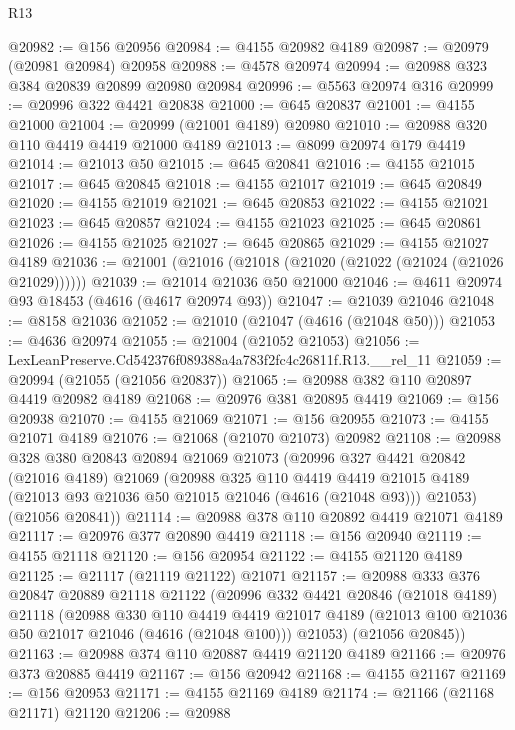 \begin{lexlean}{R13}
\begin{coremodule}
@20982 := @156 @20956
@20984 := @4155 @20982 @4189
@20987 := @20979 (@20981 @20984) @20958
@20988 := @4578 @20974
@20994 := @20988 @323 @384 @20839 @20899 @20980 @20984
@20996 := @5563 @20974 @316
@20999 := @20996 @322 @4421 @20838
@21000 := @645 @20837
@21001 := @4155 @21000
@21004 := @20999 (@21001 @4189) @20980
@21010 := @20988 @320 @110 @4419 @4419 @21000 @4189
@21013 := @8099 @20974 @179 @4419
@21014 := @21013 @50
@21015 := @645 @20841
@21016 := @4155 @21015
@21017 := @645 @20845
@21018 := @4155 @21017
@21019 := @645 @20849
@21020 := @4155 @21019
@21021 := @645 @20853
@21022 := @4155 @21021
@21023 := @645 @20857
@21024 := @4155 @21023
@21025 := @645 @20861
@21026 := @4155 @21025
@21027 := @645 @20865
@21029 := @4155 @21027 @4189
@21036 := @21001 (@21016 (@21018 (@21020 (@21022 (@21024 (@21026 @21029))))))
@21039 := @21014 @21036 @50 @21000
@21046 := @4611 @20974 @93 @18453 (@4616 (@4617 @20974 @93))
@21047 := @21039 @21046
@21048 := @8158 @21036
@21052 := @21010 (@21047 (@4616 (@21048 @50)))
@21053 := @4636 @20974
@21055 := @21004 (@21052 @21053)
@21056 := LexLeanPreserve.Cd542376f089388a4a783f2fc4c26811f.R13.__rel_11
@21059 := @20994 (@21055 (@21056 @20837))
@21065 := @20988 @382 @110 @20897 @4419 @20982 @4189
@21068 := @20976 @381 @20895 @4419
@21069 := @156 @20938
@21070 := @4155 @21069
@21071 := @156 @20955
@21073 := @4155 @21071 @4189
@21076 := @21068 (@21070 @21073) @20982
@21108 := @20988
    @328
    @380
    @20843
    @20894
    @21069
    @21073
    (@20996
      @327
      @4421
      @20842
      (@21016 @4189)
      @21069
      (@20988
        @325
        @110
        @4419
        @4419
        @21015
        @4189
        (@21013 @93 @21036 @50 @21015 @21046 (@4616 (@21048 @93)))
        @21053)
      (@21056 @20841))
@21114 := @20988 @378 @110 @20892 @4419 @21071 @4189
@21117 := @20976 @377 @20890 @4419
@21118 := @156 @20940
@21119 := @4155 @21118
@21120 := @156 @20954
@21122 := @4155 @21120 @4189
@21125 := @21117 (@21119 @21122) @21071
@21157 := @20988
    @333
    @376
    @20847
    @20889
    @21118
    @21122
    (@20996
      @332
      @4421
      @20846
      (@21018 @4189)
      @21118
      (@20988
        @330
        @110
        @4419
        @4419
        @21017
        @4189
        (@21013 @100 @21036 @50 @21017 @21046 (@4616 (@21048 @100)))
        @21053)
      (@21056 @20845))
@21163 := @20988 @374 @110 @20887 @4419 @21120 @4189
@21166 := @20976 @373 @20885 @4419
@21167 := @156 @20942
@21168 := @4155 @21167
@21169 := @156 @20953
@21171 := @4155 @21169 @4189
@21174 := @21166 (@21168 @21171) @21120
@21206 := @20988

\end{coremodule}
\end{lexlean}
